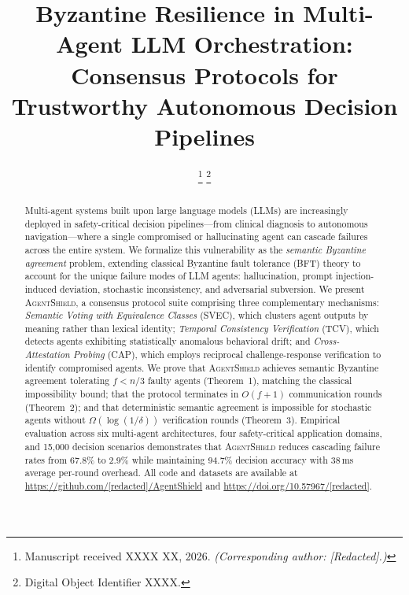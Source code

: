 \documentclass[journal,10pt]{IEEEtran}
\begin{document}
\title{Byzantine Resilience in Multi-Agent LLM Orchestration: Consensus Protocols for Trustworthy Autonomous Decision Pipelines}

\author{%
\thanks{Manuscript received XXXX XX, 2026. \emph{(Corresponding author: [Redacted].)}}
\thanks{Digital Object Identifier XXXX.}
}


\maketitle

\begin{abstract}
Multi-agent systems built upon large language models (LLMs) are increasingly deployed in safety-critical decision pipelines---from clinical diagnosis to autonomous navigation---where a single compromised or hallucinating agent can cascade failures across the entire system. We formalize this vulnerability as the \emph{semantic Byzantine agreement} problem, extending classical Byzantine fault tolerance (BFT) theory to account for the unique failure modes of LLM agents: hallucination, prompt injection-induced deviation, stochastic inconsistency, and adversarial subversion. We present \textsc{AgentShield}, a consensus protocol suite comprising three complementary mechanisms: \emph{Semantic Voting with Equivalence Classes} (SVEC), which clusters agent outputs by meaning rather than lexical identity; \emph{Temporal Consistency Verification} (TCV), which detects agents exhibiting statistically anomalous behavioral drift; and \emph{Cross-Attestation Probing} (CAP), which employs reciprocal challenge-response verification to identify compromised agents. We prove that \textsc{AgentShield} achieves semantic Byzantine agreement tolerating $f < n/3$ faulty agents (Theorem~1), matching the classical impossibility bound; that the protocol terminates in $O(f+1)$ communication rounds (Theorem~2); and that deterministic semantic agreement is impossible for stochastic agents without $\Omega(\log(1/\delta))$ verification rounds (Theorem~3). Empirical evaluation across six multi-agent architectures, four safety-critical application domains, and 15{,}000 decision scenarios demonstrates that \textsc{AgentShield} reduces cascading failure rates from 67.8\% to 2.9\% while maintaining 94.7\% decision accuracy with 38\,ms average per-round overhead. All code and datasets are available at \url{https://github.com/[redacted]/AgentShield} and \url{https://doi.org/10.57967/[redacted]}.
\end{abstract}
\end{document}
